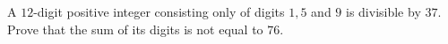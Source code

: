 A $12$-digit positive integer consisting only of digits $1,5$ and $9$ is divisible by $37$. Prove that the sum of its digits is not equal to $76$.